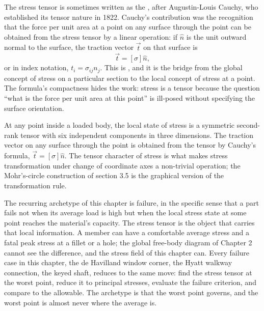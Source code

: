 The stress tensor is sometimes written as the , after Augustin-Louis Cauchy, who established its tensor
nature in 1822. Cauchy's contribution was the recognition that the
force per unit area at a point on any surface through the point can
be obtained from the stress tensor by a linear operation: if $\hat{n}$
is the unit outward normal to the surface, the traction vector $\vec
{t}$ on that surface is
\[
\vec{t} = [\sigma] \hat{n},
\]
or in index notation, $t_i = \sigma_{ij} n_j$. This is , and it is the bridge from the global concept of stress on a
particular section to the local concept of stress at a point. The
formula's compactness hides the work: stress is a tensor because the
question ``what is the force per unit area at this point'' is
ill-posed without specifying the surface orientation.

\begin{principle}
At any point inside a loaded body, the local state of stress is a
symmetric second-rank tensor with six independent components in three
dimensions. The traction vector on any surface through the point is
obtained from the tensor by Cauchy's formula, $\vec{t} = [\sigma]
\hat{n}$. The tensor character of stress is what makes stress
transformation under change of coordinate axes a non-trivial
operation; the Mohr's-circle construction of section 3.5 is the
graphical version of the transformation rule.
\end{principle}

\begin{archetype}
The recurring archetype of this chapter is failure, in the specific
sense that a part fails not when its average load is high but when the
local stress state at some point reaches the material's capacity. The
stress tensor is the object that carries that local information. A
member can have a comfortable average stress and a fatal peak stress at
a fillet or a hole; the global free-body diagram of Chapter 2 cannot
see the difference, and the stress field of this chapter can. Every
failure case in this chapter, the de Havilland window corner, the Hyatt
walkway connection, the keyed shaft, reduces to the same move: find the
stress tensor at the worst point, reduce it to principal stresses,
evaluate the failure criterion, and compare to the allowable. The
archetype is that the worst point governs, and the worst point is
almost never where the average is.
\end{archetype}

